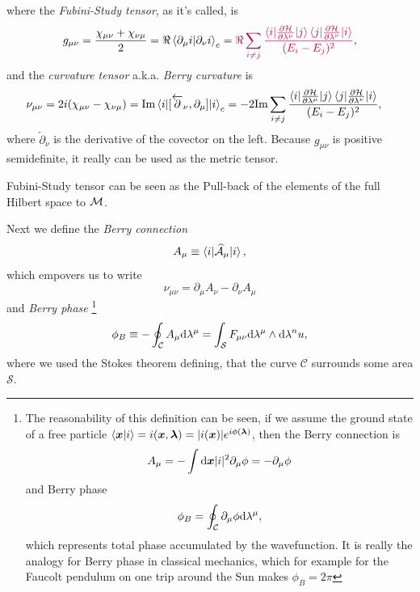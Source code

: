 where the \emph{Fubini-Study tensor}, as it's called, is
\begin{equation}
    g_{\mu\nu} = \frac{\chi_{\mu\nu}+\chi_{\nu\mu}}{2} = \Re\braket{\partial_\mu i|\partial_\nu i}_c = \textcolor{purple}{\Re \sum_{i\neq j}\frac{\braket{i|\frac{\partial \mathcal{H}}{\partial \lambda^\mu}|j}\braket{j|\frac{\partial \mathcal{H}}{\partial \lambda^\nu}|i}}{(E_i-E_j)^2}},
    \label{eq:geom.tensorREdefinition}
\end{equation}
and the \emph{curvature tensor} a.k.a. \emph{Berry curvature} is
\begin{equation}
    \begin{split}
        \nu_{\mu\nu} = 2 i(\chi_{\mu\nu}-\chi_{\nu\mu})&= \textrm{Im}\braket{i|[\overleftarrow{\partial}_\nu,\partial_\mu]|i}_c = -2 \textrm{Im} \sum_{i\neq j}\frac{\braket{i|\frac{\partial \mathcal{H}}{\partial \lambda^\mu}|j}\braket{j|\frac{\partial \mathcal{H}}{\partial \lambda^\nu}|i}}{(E_i-E_j)^2},
    \end{split}
\end{equation}
where $\overleftarrow{\partial}_\nu$ is the derivative of the covector on the left.
Because $g_{\mu\nu}$ is positive semidefinite, it really can be used as the metric tensor.

Fubini-Study tensor can be seen as the Pull-back of the elements of the full Hilbert space to $\mathcal{M}$. 


Next we define the \emph{Berry connection}
\begin{equation}
    A_\mu\equiv \braket{i|\mathcal{\widehat{A}}_\mu|i},
\end{equation}
which empovers us to write
\begin{equation}
    \nu_{\mu\nu} = \partial_\mu A_\nu-\partial_\nu A_\mu
\end{equation}
and \emph{Berry phase}
    \footnote{
        The reasonability of this definition can be seen, if we assume the ground state of a free particle
            $\braket{\bm{x}|i}=i(\bm{x},{\bm\lambda})= |i(\bm{x})|e^{i\phi({\bm\lambda})}$,
        then the Berry connection is
        \begin{equation}
            A_\mu=-\int \mathrm{d} \bm{x}|i|^2\partial_\mu \phi = -\partial_\mu \phi
        \end{equation} 
        and Berry phase
        \begin{equation}
            \phi_B=\oint_\mathcal{C} \partial_\mu \phi \mathrm{d} \lambda^\mu,
        \end{equation}
        which represents total phase accumulated by the wavefunction. It is really the analogy for Berry phase in classical mechanics, which for example for the Faucolt pendulum on one trip around the Sun makes $\phi_B=2\pi$
    }
\begin{equation}
    \phi_B\equiv-\oint_\mathcal{C} A_\mu \mathrm{d} \lambda^\mu=\int_\mathcal{S} F_{\mu\nu}\mathrm{d} \lambda^\mu \wedge \mathrm{d}\lambda^nu,
\end{equation}
where we used the Stokes theorem defining, that the curve $\mathcal{C}$ surrounds some area $\mathcal{S}$.

